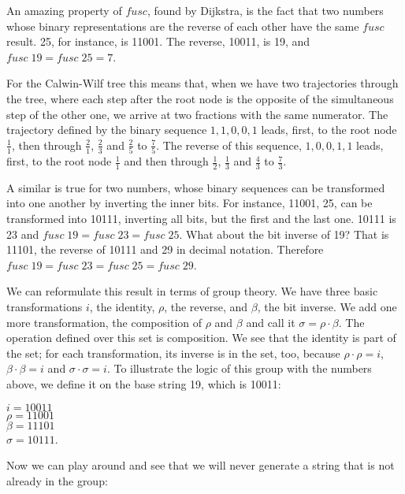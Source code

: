 \documentclass[tikz]{scrreprt}
\newcommand{\Varid}[1]{\mathit{#1}}
\begin{document}
An amazing property of \ensuremath{\Varid{fusc}},
found by Dijkstra, is the fact that
two numbers whose binary representations
are the reverse of each other
have the same \ensuremath{\Varid{fusc}} result. 
25, for instance, is 11001.
The reverse, 10011, is 19,
and \ensuremath{\Varid{fusc}\;\mathrm{19}\mathrel{=}\Varid{fusc}\;\mathrm{25}\mathrel{=}\mathrm{7}}.

For the Calwin-Wilf tree this means that,
when we have two trajectories through the tree,
where each step after the root node
is the opposite of the simultaneous step
of the other one, we arrive at two fractions
with the same numerator.
The trajectory defined by the binary sequence
$1,1,0,0,1$ leads, first, to the root node $\frac{1}{1}$,
then through 
$\frac{2}{1}$,
$\frac{2}{3}$ and
$\frac{2}{5}$ to
$\frac{7}{5}$.
The reverse of this sequence, $1,0,0,1,1$ leads,
first, to the root node $\frac{1}{1}$ and then through
$\frac{1}{2}$,
$\frac{1}{3}$ and
$\frac{4}{3}$ to
$\frac{7}{3}$.

A similar is true for two numbers,
whose binary sequences can be transformed
into one another by inverting the inner bits.
For instance, 11001, 25, can be transformed into
10111, inverting all bits, but the first and the last one.
10111 is 23 and \ensuremath{\Varid{fusc}\;\mathrm{19}\mathrel{=}\Varid{fusc}\;\mathrm{23}\mathrel{=}\Varid{fusc}\;\mathrm{25}}.
What about the bit inverse of 19?
That is 11101, the reverse of 10111 and 29 in decimal notation.
Therefore \ensuremath{\Varid{fusc}\;\mathrm{19}\mathrel{=}\Varid{fusc}\;\mathrm{23}\mathrel{=}\Varid{fusc}\;\mathrm{25}\mathrel{=}\Varid{fusc}\;\mathrm{29}}.

We can reformulate this result in terms of group theory.
We have three basic transformations $i$, the identity,
$\rho$, the reverse, and $\beta$, the bit inverse.
We add one more transformation, the composition of
$\rho$ and $\beta$ and call it $\sigma = \rho \cdot \beta$.
The operation defined over this set is composition.
We see that the identity is part of the set;
for each transformation, its inverse is in the set, too,
because $\rho \cdot \rho = i$, $\beta \cdot \beta = i$ and
$\sigma \cdot \sigma = i$.
To illustrate the logic of this group with the numbers above,
we define it on the base string 19, which is 10011:

$i = 10011$\\
$\rho = 11001$\\
$\beta = 11101$\\
$\sigma = 10111$.

Now we can play around and see that we will
never generate a string that is not already 
in the group:
\end{document}
